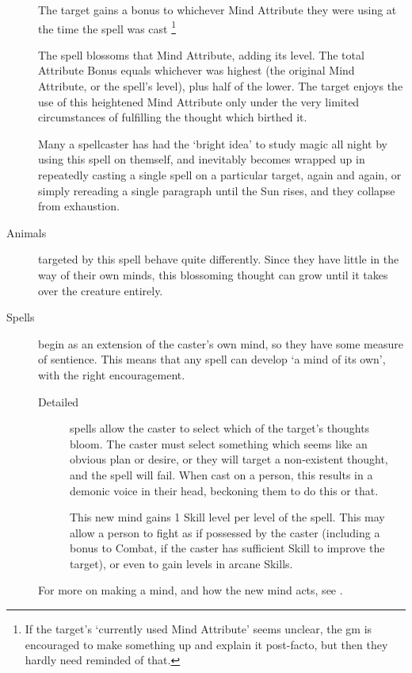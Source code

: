 \begin{multicols}{2}
\begin{description}
    The target gains a bonus to whichever Mind Attribute they were using at the time the spell was cast%
    \footnote{If the target's `currently used Mind Attribute' seems unclear, the \gls{gm} is encouraged to make something up and explain it post-facto, but then they hardly need reminded of that.}

    The spell blossoms that Mind Attribute, adding its level.
    The total Attribute Bonus equals whichever was highest (the original Mind Attribute, or the spell's level), plus half of the lower.%
    The target enjoys the use of this heightened Mind Attribute only under the very limited circumstances of fulfilling the thought which birthed it.

    Many a spellcaster has had the `bright idea' to study magic all night by using this spell on themself, and inevitably becomes wrapped up in repeatedly casting a single spell on a particular target, again and again, or simply rereading a single paragraph until the Sun rises, and they collapse from exhaustion.
  \item[Animals]
    targeted by this spell behave quite differently.
    Since they have little in the way of their own minds, this blossoming thought can grow until it takes over the creature entirely.
  \item[Spells]
    begin as an extension of the caster's own mind, so they have some measure of sentience.
    This means that any spell can develop `a mind of its own', with the right encouragement.
    \begin{description}
      \item[Detailed]
        spells allow the caster to select which of the target's thoughts bloom.
        The caster must select something which seems like an obvious plan or desire, or they will target a non-existent thought, and the spell will fail.
        When cast on a person, this results in a demonic voice in their head, beckoning them to do this or that.

        This new mind gains 1 Skill level per level of the spell.
        This may allow a person to fight as if possessed by the caster (including a bonus to Combat, if the caster has sufficient Skill to improve the target), or even to gain levels in arcane Skills.
    \end{description}
    For more on making a mind, and how the new mind acts, see .


\end{description}
\end{multicols}
